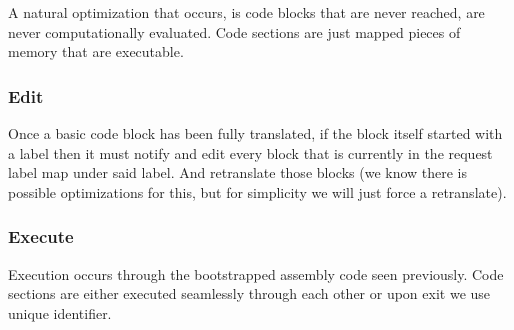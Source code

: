 A natural optimization that occurs, is code blocks that are never reached, are
never computationally evaluated. Code sections are just mapped pieces of memory
that are executable.

\subsubsection{Edit} Once a basic code block has been fully translated, if the
block itself started with a label then it must notify and edit every block that
is currently in the request label map under said label. And retranslate those
blocks (we know there is possible optimizations for this, but for simplicity we
will just force a retranslate).

\subsubsection{Execute} Execution occurs through the bootstrapped assembly code
seen previously. Code sections are either executed seamlessly through each
other or upon exit we use unique identifier.




